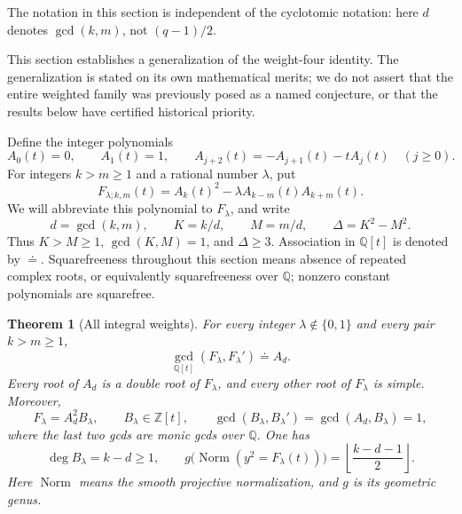 \documentclass[11pt,a4paper]{article}
\newtheorem{theorem}{Theorem}[section]
\theoremstyle{definition}
\theoremstyle{remark}
\begin{document}
The notation in this section is independent of the cyclotomic notation:
here $d$ denotes $\gcd(k,m)$, not $(q-1)/2$.


This section establishes a generalization of the weight-four identity.
The generalization is stated on its own mathematical merits; we do not
assert that the entire weighted family was previously posed as a named
conjecture, or that the results below have certified historical priority.

Define the integer polynomials
\begin{equation}\label{iw:A}
 A_0(t)=0,\qquad A_1(t)=1,\qquad
 A_{j+2}(t)=-A_{j+1}(t)-tA_j(t)\quad(j\ge0).
\end{equation}
For integers \(k>m\ge1\) and a rational number \(\lambda\), put
\begin{equation}\label{iw:F}
 F_{\lambda;k,m}(t)
   =A_k(t)^2-\lambda A_{k-m}(t)A_{k+m}(t).
\end{equation}
We will abbreviate this polynomial to \(F_\lambda\), and write
\begin{equation}\label{iw:parameters}
 d=\gcd(k,m),\qquad K=k/d,\qquad M=m/d,\qquad
 \Delta=K^2-M^2.
\end{equation}
Thus \(K>M\ge1\), \(\gcd(K,M)=1\), and \(\Delta\ge3\).
Association in \(\mathbb Q[t]\) is denoted by \(\doteq\).
Squarefreeness throughout this section means absence of repeated
complex roots, or equivalently squarefreeness over \(\mathbb Q\);
nonzero constant polynomials are squarefree.

\begin{theorem}[All integral weights]\label{iw:integral}
For every integer \(\lambda\notin\{0,1\}\) and every pair \(k>m\ge1\),
\begin{equation}\label{iw:integral-gcd}
 \boxed{\gcd_{\mathbb Q[t]}(F_\lambda,F_\lambda')\doteq A_d.}
\end{equation}
Every root of \(A_d\) is a double root of \(F_\lambda\), and every
other root of \(F_\lambda\) is simple. Moreover,
\begin{equation}\label{iw:integral-quotient}
 F_\lambda=A_d^2B_\lambda,\qquad B_\lambda\in\mathbb Z[t],
 \qquad \gcd(B_\lambda,B_\lambda')=
 \gcd(A_d,B_\lambda)=1,
\end{equation}
where the last two gcds are monic gcds over \(\mathbb Q\).
One has
\begin{equation}\label{iw:integral-degree-genus}
 \deg B_\lambda=k-d\ge1,\qquad
 g\bigl(\operatorname{Norm}(y^2=F_\lambda(t))\bigr)
 =\left\lfloor\frac{k-d-1}{2}\right\rfloor.
\end{equation}
Here \(\operatorname{Norm}\) means the smooth projective normalization,
and \(g\) is its geometric genus.
\end{theorem}
\end{document}
